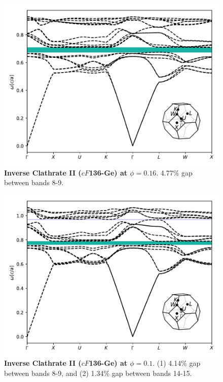 \documentclass[fleqn,amsmath,amssymb,superscriptaddress, reprint,prl]{revtex4-1}
\begin{document}
\begin{figure}
\includegraphics[width=0.9\linewidth]{workspace/98bea964caf8f018d93d719c76c94075/images/r=20.pdf}
	\caption{\textbf{Inverse Clathrate II ($cF$136-Ge) at $\phi=0.16$}. 4.77\% gap between bands 8-9.}
\end{figure}

\begin{figure}
\includegraphics[width=0.9\linewidth]{workspace/98bea964caf8f018d93d719c76c94075/images/r=22.pdf}
	\caption{\textbf{Inverse Clathrate II ($cF$136-Ge) at $\phi=0.1$}. (1) 4.14\% gap between bands 8-9, and (2) 1.34\% gap between bands 14-15.}
\end{figure}
\end{document}
